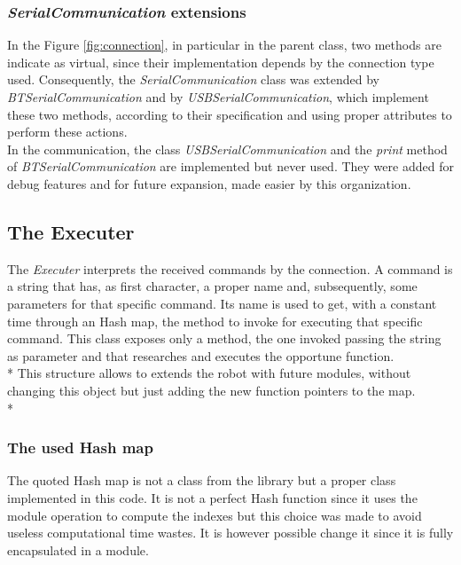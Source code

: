 \subsubsection{\textit{SerialCommunication} extensions}
In the Figure \ref{fig:connection}, in particular in the parent class, two methods are indicate as virtual, since their implementation depends by the connection type used. Consequently, the \textit{SerialCommunication} class was extended by \textit{BTSerialCommunication} and by \textit{USBSerialCommunication}, which implement these two methods, according to their specification and using proper attributes to perform these actions.\\
In the communication, the class \textit{USBSerialCommunication} and the \textit{print} method of \textit{BTSerialCommunication} are implemented but never used. They were added for debug features and for future expansion, made easier by this organization.
\newpage

\subsection{The Executer}
The \textit{Executer} interprets the received commands by the connection. A command is a string that has, as first character, a proper name and, subsequently, some parameters for that specific command. Its name is used to get, with a constant time through an Hash map, the method to invoke for executing that specific command. This class exposes only a method, the one invoked passing the string as parameter and that researches and executes the opportune function.\\*
This structure allows to extends the robot with future modules, without changing this object but just adding the new function pointers to the map.\\*

\subsubsection{The used Hash map}
The quoted Hash map is not a class from the library but a proper class implemented in this code. It is not a perfect Hash function since it uses the module operation to compute the indexes but this choice was made to avoid useless computational time wastes. It is however possible change it since it is fully encapsulated in a module.\\

